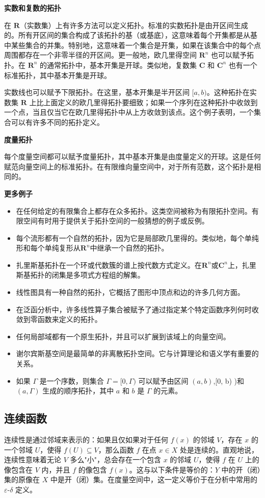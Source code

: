 \textbf{实数和复数的拓扑}

在 $\mathbf{R}$（实数集）上有许多方法可以定义拓扑。标准的实数拓扑是由开区间生成的。所有开区间的集合构成了该拓扑的基（或基底），这意味着每个开集都是从基中某些集合的并集。特别地，这意味着一个集合是开集，如果在该集合中的每个点周围都存在一个非零半径的开区间。更一般地，欧几里得空间 $\mathbf{R}^n$ 也可以赋予拓扑。在 $\mathbf{R}^n$ 的通常拓扑中，基本开集是开球。类似地，复数集 $\mathbf{C}$ 和 $\mathbf{C}^n$ 也有一个标准拓扑，其中基本开集是开球。

实数线也可以赋予下限拓扑。在这里，基本开集是半开区间 $[a, b)$。这种拓扑在实数集 $\mathbf{R}$ 上比上面定义的欧几里得拓扑要细致；如果一个序列在这种拓扑中收敛到一个点，当且仅当它在欧几里得拓扑中从上方收敛到该点。这个例子表明，一个集合可以有许多不同的拓扑定义。

\textbf{度量拓扑}

每个度量空间都可以赋予度量拓扑，其中基本开集是由度量定义的开球。这是任何赋范向量空间上的标准拓扑。在有限维向量空间中，对于所有范数，这个拓扑是相同的。

\textbf{更多例子}

\begin{itemize}
\item 在任何给定的有限集合上都存在众多拓扑。这类空间被称为有限拓扑空间。有限空间有时用于提供关于拓扑空间的一般猜想的例子或反例。
\item 每个流形都有一个自然的拓扑，因为它是局部欧几里得的。类似地，每个单纯形和每个单纯复形从$\mathbf{R}^n$中继承一个自然的拓扑。
\item 扎里斯基拓扑在一个环或代数簇的谱上按代数方式定义。在$\mathbf{R}^n$或$\mathbf{C}^n$上，扎里斯基拓扑的闭集是多项式方程组的解集。
\item 线性图具有一种自然的拓扑，它概括了图形中顶点和边的许多几何方面。
\item 在泛函分析中，许多线性算子集合被赋予了通过指定某个特定函数序列何时收敛到零函数来定义的拓扑。
\item 任何局部域都有一个原生拓扑，并且可以扩展到该域上的向量空间。
\item 谢尔宾斯基空间是最简单的非离散拓扑空间。它与计算理论和语义学有重要的关系。
\item 如果 $\Gamma$ 是一个序数，则集合 $\Gamma = [0, \Gamma)$ 可以赋予由区间 $(a, b)$,[0, b) )和 $(a, \Gamma)$ 生成的顺序拓扑，其中 $a$ 和 $b$ 是 $\Gamma$ 的元素。
\end{itemize}
\subsection{连续函数}
连续性是通过邻域来表示的：如果且仅如果对于任何 $f(x)$ 的邻域 $V$，存在 $x$ 的一个邻域 $U$，使得 $f(U) \subseteq V$，那么函数 $f$ 在点 $x \in X$ 处是连续的。直观地说，连续性意味着无论 $V$ 多么"小"，总会存在一个包含 $x$ 的邻域 $U$，使得 $f$ 在 $U$ 上的像包含在 $V$ 内，并且 $f$ 的像包含 $f(x)$。这与以下条件是等价的：$Y$ 中的开（闭）集的原像在 $X$ 中是开（闭）集。在度量空间中，这一定义等价于在分析中常用的 $\varepsilon$-$\delta$ 定义。

